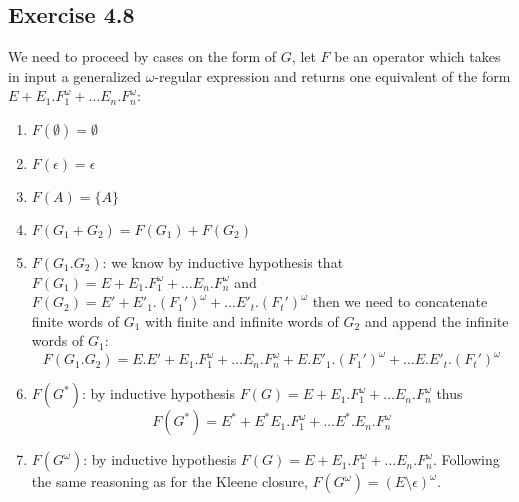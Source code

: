 \documentclass{article}
\begin{document}
	\subsection*{Exercise 4.8}
	We need to proceed by cases on the form of $G$, let $F$ be an operator which takes in input a generalized $\omega$-regular expression and returns one equivalent of the form $E+E_1.F_1^\omega+\dots E_n.F^\omega_n$:
	\begin{enumerate}
		\item $F(\emptyset)=\emptyset$
		\item $F(\epsilon)=\epsilon$
		\item $F(A)=\{A\}$
		\item $F(G_1+G_2)=F(G_1)+F(G_2)$
		\item $F(G_1.G_2)$: we know by inductive hypothesis that $F(G_1)=E+E_1.F^\omega_1+\dots E_n.F_n^\omega$ and $F(G_2)=E'+E'_1.(F_1')^\omega+\dots E'_t.(F_t')^\omega$ then we need to concatenate finite words of $G_1$ with finite and infinite words of $G_2$ and append the infinite words of $G_1$:
		$$
		F(G_1.G_2)=E.E'+E_1.F^\omega_1+\dots E_n.F_n^\omega+E.E'_1.(F_1')^\omega+\dots E.E'_t.(F_t')^\omega
		$$
		\item $F(G^*)$: by inductive hypothesis $F(G)=E+E_1.F^\omega_1+\dots E_n.F_n^\omega$ thus $$F(G^*)=E^*+E^*E_1.F^\omega_1+\dots E^*.E_n.F_n^\omega$$
		\item $F(G^\omega)$: by inductive hypothesis $F(G)=E+E_1.F^\omega_1+\dots E_n.F_n^\omega$. Following the same reasoning as for the Kleene closure, $F(G^\omega)=(E \setminus \epsilon)^\omega$.
	\end{enumerate}
	\newpage
\end{document}
